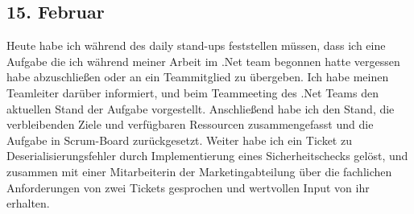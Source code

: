 \subsection{15. Februar}
Heute habe ich während des daily stand-ups feststellen müssen, dass ich eine Aufgabe die ich während meiner Arbeit im .Net team begonnen hatte vergessen habe abzuschließen oder an ein Teammitglied zu übergeben. Ich habe meinen Teamleiter darüber informiert, und beim Teammeeting des .Net Teams den aktuellen Stand der Aufgabe vorgestellt. Anschließend habe ich den Stand, die verbleibenden Ziele und verfügbaren Ressourcen zusammengefasst und die Aufgabe in Scrum-Board zurückgesetzt. Weiter habe ich ein Ticket zu Deserialisierungsfehler durch Implementierung eines Sicherheitschecks gelöst, und zusammen mit einer Mitarbeiterin der Marketingabteilung über die fachlichen Anforderungen von zwei Tickets gesprochen und wertvollen Input von ihr erhalten.